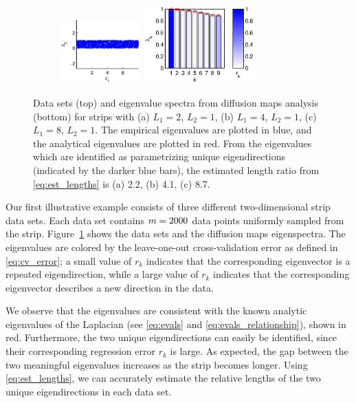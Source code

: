 \begin{figure}[!t]
%
%
\begin{subfigure}{0.3\textwidth}
\includegraphics[height=2.5cm]{strip_data_L8}
\includegraphics[height=3cm]{strip_spectrum_L8}
\caption{}
\end{subfigure}
%
\caption[Eigenvalues and eigenvectors of diffusion maps on a two-dimensional strip]{Data sets (top) and eigenvalue spectra from diffusion maps analysis (bottom) for strips with (a) $L_1 = 2$, $L_2 = 1$, (b) $L_1 = 4$, $L_2 = 1$, (c) $L_1 = 8$, $L_2 = 1$. The empirical eigenvalues are plotted in blue, and the analytical eigenvalues are plotted in red. From the eigenvalues which are identified as parametrizing unique eigendirections (indicated by the darker blue bars), the estimated length ratio from \eqref{eq:est_lengths} is (a) 2.2, (b) 4.1, (c) 8.7.}
\label{fig:strip_compare_analytic}
\end{figure}

Our first illustrative example consists of three different two-dimensional strip data sets.
%
Each data set contains $m=2000$ data points uniformly sampled from the strip.
%
Figure~\ref{fig:strip_compare_analytic} shows the data sets and the diffusion maps eigenspectra.
%
The eigenvalues are colored by the leave-one-out cross-validation error as defined in \eqref{eq:cv_error}; a small value of $r_k$ indicates that the corresponding eigenvector is a repeated eigendirection, while a large value of $r_k$ indicates that the corresponding eigenvector describes a new direction in the data.
%

We observe that the eigenvalues are consistent with the known analytic eigenvalues of the Laplacian (see \eqref{eq:evals} and \eqref{eq:evals_relationship}), shown in red.
%
Furthermore, the two unique eigendirections can easily be identified, since their corresponding regression error $r_k$ is large.
%
As expected, the gap between the two meaningful eigenvalues increases as the strip becomes longer.
%
Using \eqref{eq:est_lengths}, we can accurately estimate the relative lengths of the two unique eigendirections in each data set.


